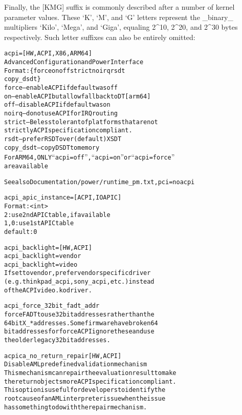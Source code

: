 \documentclass[a4paper,8pt,english]{sphinxmanual}
\begin{document}
Finally, the {[}KMG{]} suffix is commonly described after a number of kernel
parameter values. These `K', `M', and `G' letters represent the \_binary\_
multipliers `Kilo', `Mega', and `Giga', equaling 2\textasciicircum{}10, 2\textasciicircum{}20, and 2\textasciicircum{}30
bytes respectively. Such letter suffixes can also be entirely omitted:
\begin{alltt}
        acpi=           {[}HW,ACPI,X86,ARM64{]}
                        Advanced Configuration and Power Interface
                        Format: \{ force \textbar{} on \textbar{} off \textbar{} strict \textbar{} noirq \textbar{} rsdt \textbar{}
                                  copy\_dsdt \}
                        force -- enable ACPI if default was off
                        on -- enable ACPI but allow fallback to DT {[}arm64{]}
                        off -- disable ACPI if default was on
                        noirq -- do not use ACPI for IRQ routing
                        strict -- Be less tolerant of platforms that are not
                                strictly ACPI specification compliant.
                        rsdt -- prefer RSDT over (default) XSDT
                        copy\_dsdt -- copy DSDT to memory
                        For ARM64, ONLY ``acpi=off'', ``acpi=on'' or ``acpi=force''
                        are available

                        See also Documentation/power/runtime\_pm.txt, pci=noacpi

        acpi\_apic\_instance=     {[}ACPI, IOAPIC{]}
                        Format: \textless{}int\textgreater{}
                        2: use 2nd APIC table, if available
                        1,0: use 1st APIC table
                        default: 0

        acpi\_backlight= {[}HW,ACPI{]}
                        acpi\_backlight=vendor
                        acpi\_backlight=video
                        If set to vendor, prefer vendor specific driver
                        (e.g. thinkpad\_acpi, sony\_acpi, etc.) instead
                        of the ACPI video.ko driver.

        acpi\_force\_32bit\_fadt\_addr
                        force FADT to use 32 bit addresses rather than the
                        64 bit X\_* addresses. Some firmware have broken 64
                        bit addresses for force ACPI ignore these and use
                        the older legacy 32 bit addresses.

        acpica\_no\_return\_repair {[}HW, ACPI{]}
                        Disable AML predefined validation mechanism
                        This mechanism can repair the evaluation result to make
                        the return objects more ACPI specification compliant.
                        This option is useful for developers to identify the
                        root cause of an AML interpreter issue when the issue
                        has something to do with the repair mechanism.


\end{alltt}
\end{document}
